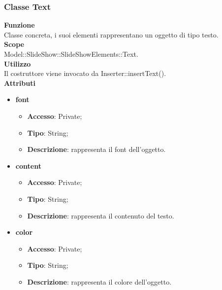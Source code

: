 {		\subsubsection{Classe Text}{
			\label{Text}
			\textbf{Funzione}\\
				\indent Classe concreta, i suoi elementi rappresentano un oggetto di tipo testo.\\
		   	\textbf{Scope}\\
				\indent Model::SlideShow::SlideShowElements::Text.\\
			\textbf{Utilizzo}\\
				\indent Il costruttore viene invocato da Inserter::insertText().\\
			\textbf{Attributi}
			\begin{itemize}
				\item \textbf{font}
				\begin{itemize}
					\item \textbf{Accesso}: Private;
					\item \textbf{Tipo}: String;
					\item \textbf{Descrizione}: rappresenta il font dell’oggetto.
				\end{itemize}
				\item \textbf{content}
				\begin{itemize}
					\item \textbf{Accesso}: Private;
					\item \textbf{Tipo}: String;
					\item \textbf{Descrizione}: rappresenta il contenuto del testo.
				\end{itemize}
				\item \textbf{color}
				\begin{itemize}
					\item \textbf{Accesso}: Private;
					\item \textbf{Tipo}: String;
					\item \textbf{Descrizione}: rappresenta il colore dell’oggetto.
				\end{itemize}
			\end{itemize}
			
}}
